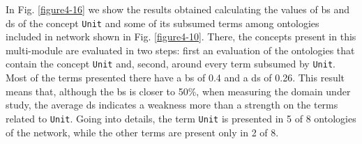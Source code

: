 In Fig. \ref{figure4-16} we show the results obtained calculating the values of \gls{bs} and \gls{ds}  of the concept \texttt{Unit}   and some of its subsumed terms among ontologies included in network  shown in Fig. \ref{figure4-10}. There, the concepts present in this multi-module are evaluated in two steps: first an evaluation of the ontologies that contain the concept \texttt{Unit} and, second, around every term subsumed by \texttt{Unit}. Most of the terms presented there have a \gls{bs} of 0.4 and a \gls{ds} of 0.26. This result means that, although the \gls{bs} is closer to 50\%, when measuring the domain under study, the average \gls{ds} indicates a weakness more than a strength on the terms related to \texttt{Unit}. Going into details, the term \texttt{Unit} is presented in 5 of 8 ontologies of the network, while the other terms are present only in 2 of 8. 


